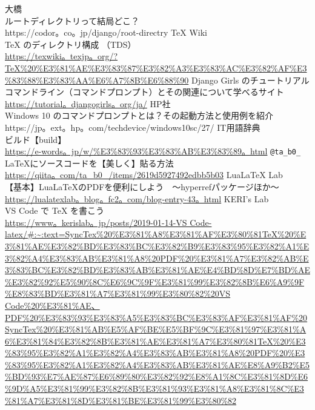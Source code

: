 \documentclass{ltjsarticle}
\begin{document}
\begin{thebibliography}{999}
  大橋\\
  ルートディレクトリって結局どこ？\\
  https://codor。co。jp/django/root-directry
  TeX Wiki\\
  TeX のディレクトリ構成 （TDS） \\
  \url{https://texwiki。texjp。org/?TeX%20%E3%81%AE%E3%83%87%E3%82%A3%E3%83%AC%E3%82%AF%E3%83%88%E3%83%AA%E6%A7%8B%E6%88%90}
  Django Girls のチュートリアル\\
  コマンドライン（コマンドプロンプト）とその関連について学べるサイト\\
  \url{https://tutorial。djangogirls。org/ja/}
  HP社\\
  Windows 10 のコマンドプロンプトとは？その起動方法と使用例を紹介\\
  https://jp。ext。hp。com/techdevice/windows10sc/27/
  IT用語辞典\\
  ビルド【build】\\
  \url{https://e-words。jp/w/%E3%83%93%E3%83%AB%E3%83%89。html}
  \verb|@ta_b0_|\\
  LaTeXにソースコードを【美しく】貼る方法\\
  \url{https://qiita。com/ta_b0_/items/2619d5927492edbb5b03}
  LuaLaTeX Lab\\
  【基本】LuaLaTeXのPDFを便利にしよう　～hyperrefパッケージほか～\\
  \url{https://lualatexlab。blog。fc2。com/blog-entry-43。html}
  KERI's Lab\\
  VS Code で TeX を書こう\\
  \url{https://www。kerislab。jp/posts/2019-01-14-VS Code-latex/#:~:text=SyncTex%20%E3%81%A8%E3%81%AF%E3%80%81TeX%20%E3%81%AE%E3%82%BD%E3%83%BC%E3%82%B9%E3%83%95%E3%82%A1%E3%82%A4%E3%83%AB%E3%81%A8%20PDF%20%E3%81%A7%E3%82%AB%E3%83%BC%E3%82%BD%E3%83%AB%E3%81%AE%E4%BD%8D%E7%BD%AE%E3%82%92%E5%90%8C%E6%9C%9F%E3%81%99%E3%82%8B%E6%A9%9F%E8%83%BD%E3%81%A7%E3%81%99%E3%80%82%20VS Code%20%E3%81%AE、PDF%20%E3%83%93%E3%83%A5%E3%83%BC%E3%83%AF%E3%81%AF%20SyncTex%20%E3%81%AB%E5%AF%BE%E5%BF%9C%E3%81%97%E3%81%A6%E3%81%84%E3%82%8B%E3%81%AE%E3%81%A7%E3%80%81TeX%20%E3%83%95%E3%82%A1%E3%82%A4%E3%83%AB%E3%81%A8%20PDF%20%E3%83%95%E3%82%A1%E3%82%A4%E3%83%AB%E3%81%AE%E8%A9%B2%E5%BD%93%E7%AE%87%E6%89%80%E3%82%92%E8%A1%8C%E3%81%8D%E6%9D%A5%E3%81%99%E3%82%8B%E3%81%93%E3%81%A8%E3%81%8C%E3%81%A7%E3%81%8D%E3%81%BE%E3%81%99%E3%80%82}

\end{thebibliography}
\end{document}
